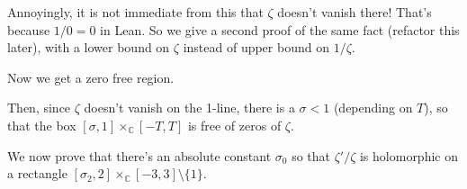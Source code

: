 {


Annoyingly, it is not immediate from this that $\zeta$ doesn't vanish there! That's because
$1/0 = 0$ in Lean. So we give a second proof of the same fact (refactor this later), with a lower
 bound on $\zeta$ instead of upper bound on $1 / \zeta$.


Now we get a zero free region.




Then, since $\zeta$ doesn't vanish on the 1-line, there is a $\sigma<1$ (depending on $T$), so that
the box $[\sigma,1] \times_{ℂ} [-T,T]$ is free of zeros of $\zeta$.


We now prove that there's an absolute constant $\sigma_0$ so that $\zeta'/\zeta$ is holomorphic on
a rectangle $[\sigma_2,2] \times_{ℂ} [-3,3] \setminus \{1\}$.



}